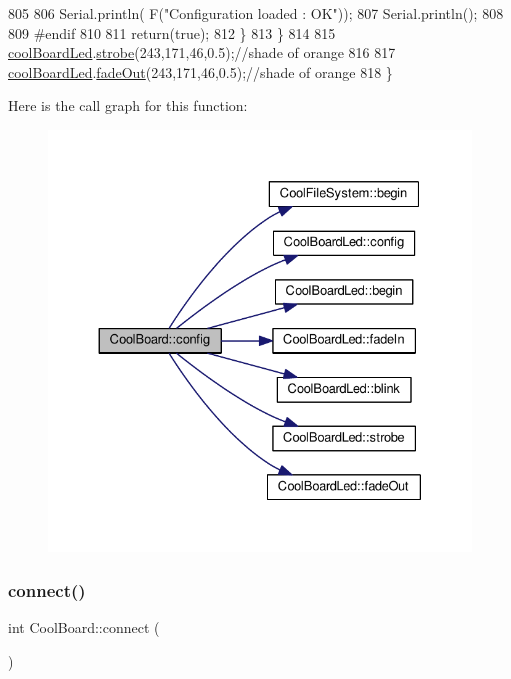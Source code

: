 \begin{DoxyCode}
805 
806                 Serial.println( F(\textcolor{stringliteral}{"Configuration loaded : OK"}));
807                 Serial.println();
808 
809 \textcolor{preprocessor}{            #endif}
810 
811             \textcolor{keywordflow}{return}(\textcolor{keyword}{true});
812         \}
813     \}
814 
815     \hyperlink{class_cool_board_a1b1d3c684a5baa56b08486e192fd8e97}{coolBoardLed}.\hyperlink{class_cool_board_led_ad5f0de4c628cbfbf49896042831c64ad}{strobe}(243,171,46,0.5);\textcolor{comment}{//shade of orange}
816     
817     \hyperlink{class_cool_board_a1b1d3c684a5baa56b08486e192fd8e97}{coolBoardLed}.\hyperlink{class_cool_board_led_a93d545679237e8cc858324367149775c}{fadeOut}(243,171,46,0.5);\textcolor{comment}{//shade of orange               }
818 \}
\end{DoxyCode}
Here is the call graph for this function\+:\nopagebreak
\begin{figure}[H]
\begin{center}
\leavevmode
\includegraphics[width=330pt]{d7/df9/class_cool_board_a583a874c09c07e70a6eb9229fc4beddb_cgraph}
\end{center}
\end{figure}
\mbox{\label{class_cool_board_a519de78b807f8ec6463ff484eb925918}} 
\subsubsection{\texorpdfstring{connect()}{connect()}}
{\footnotesize\ttfamily int Cool\+Board\+::connect (\begin{DoxyParamCaption}{ }\end{DoxyParamCaption})}


